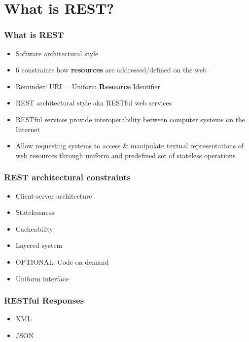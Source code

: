 \section{What is REST?}

\frame{\tableofcontents[currentsection]}

\begin{frame}
    \frametitle{What is REST}

    \begin{itemize}
        \item Software architectural style
        \item 6 constraints how \textbf{resources} are addressed/defined on the web
        \item Reminder: URI = Uniform \textbf{Resource} Identifier
        \item REST architectural style aka RESTful web services
    \end{itemize}

    \vfill
    \small

    \begin{itemize}
        \item RESTful services provide interoperability between computer systems on the Internet
        \item Allow requesting systems to access \& manipulate textual representations of web resources through uniform and predefined set of stateless operations
    \end{itemize}
\end{frame}

\begin{frame}
    \frametitle{REST architectural constraints}

    \begin{itemize}
        \item Client-server architecture
        \item Statelessness
        \item Cacheability
        \item Layered system
        \item OPTIONAL: Code on demand
        \item Uniform interface
    \end{itemize}
\end{frame}

\begin{frame}
    \frametitle{RESTful Responses}

    \begin{itemize}
        \item XML
        \item JSON
    \end{itemize}
\end{frame}